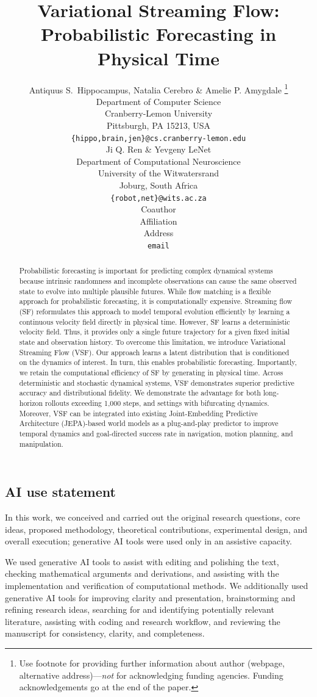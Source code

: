 \documentclass{article} %
\title{Variational Streaming Flow: Probabilistic Forecasting in Physical Time}
\author{Antiquus S.~Hippocampus, Natalia Cerebro \& Amelie P. Amygdale \thanks{ Use footnote for providing further information
about author (webpage, alternative address)---\emph{not} for acknowledging
funding agencies.  Funding acknowledgements go at the end of the paper.} \\
Department of Computer Science\\
Cranberry-Lemon University\\
Pittsburgh, PA 15213, USA \\
\texttt{\{hippo,brain,jen\}@cs.cranberry-lemon.edu} \\
\And
Ji Q. Ren \& Yevgeny LeNet \\
Department of Computational Neuroscience \\
University of the Witwatersrand \\
Joburg, South Africa \\
\texttt{\{robot,net\}@wits.ac.za} \\
\AND
Coauthor \\
Affiliation \\
Address \\
\texttt{email}
}
\numberwithin{equation}{section}
\begin{document}
\maketitle

\begin{abstract}
Probabilistic forecasting is important for predicting complex dynamical systems because intrinsic randomness and incomplete observations can cause the same observed state to evolve into multiple plausible futures. While flow matching is a flexible approach for probabilistic forecasting, it is computationally expensive. Streaming flow (SF) reformulates this approach to model temporal evolution efficiently by learning a continuous velocity field directly in physical time. However, SF learns a deterministic velocity field. Thus, it provides only a single future trajectory for a given fixed initial state and observation history. To overcome this limitation, we introduce Variational Streaming Flow (VSF). Our approach learns a latent distribution that is conditioned on the dynamics of interest. In turn, this enables probabilistic forecasting. Importantly, we retain the computational efficiency of SF by generating in physical time. Across deterministic and stochastic dynamical systems, VSF demonstrates superior predictive accuracy and distributional fidelity. We demonstrate the advantage for both long-horizon rollouts exceeding 1,000 steps, and settings with bifurcating dynamics. Moreover, VSF can be integrated into existing Joint-Embedding Predictive Architecture (JEPA)-based world models as a plug-and-play predictor to improve temporal dynamics and goal-directed success rate in navigation, motion planning, and manipulation.
\end{abstract}





\clearpage
\subsection*{AI use statement}
In this work, we conceived and carried out the original research questions, core ideas, proposed methodology, theoretical contributions, experimental design, and overall execution; generative AI tools were used only in an assistive capacity.

We used generative AI tools to assist with editing and polishing the text, checking mathematical arguments and derivations, and assisting with the implementation and verification of computational methods. We additionally used generative AI tools for  improving clarity and presentation, brainstorming and refining research ideas, searching for and identifying potentially relevant literature, assisting with coding and research workflow, and reviewing the manuscript for consistency, clarity, and completeness.
\end{document}

